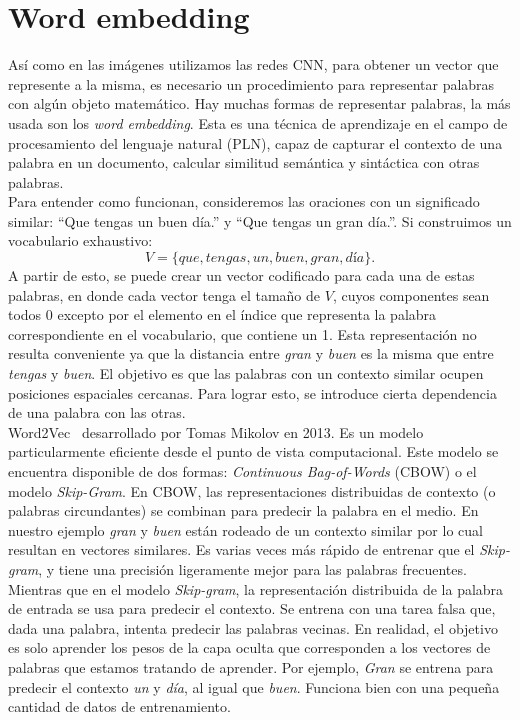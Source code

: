 \section{Word embedding} \label{sec:wordembedding}
Así como en las imágenes utilizamos las redes CNN, para obtener un vector que represente a la misma, es necesario un procedimiento para representar palabras con algún objeto matemático. Hay muchas formas de representar palabras, la más usada son los \textit{word embedding}. Esta es una técnica de aprendizaje en el campo de procesamiento del lenguaje natural (PLN), capaz de capturar el contexto de una palabra en un documento, calcular similitud semántica y sintáctica con otras palabras.\\

Para entender como funcionan, consideremos las oraciones con un significado similar: ``Que tengas un buen día.'' y ``Que tengas un gran día.''. Si construimos un vocabulario exhaustivo:
 \[ V = \{que, tengas, un, buen, gran, día\}. \]
A partir de esto, se puede crear un vector codificado para cada una de estas palabras, en donde cada vector tenga el tamaño de $V$, cuyos componentes sean todos 0 excepto por el elemento en el índice que representa la palabra correspondiente en el vocabulario, que contiene un 1. Esta representación no resulta conveniente ya que la distancia entre \textit{gran} y \textit{buen} es la misma que entre \textit{tengas} y \textit{buen}.  El objetivo es que las palabras con un contexto similar ocupen posiciones espaciales cercanas. Para lograr esto, se introduce cierta dependencia de una palabra con las otras.\\

Word2Vec~\cite{mikolov2013distributed} desarrollado por Tomas Mikolov en 2013. Es un modelo particularmente eficiente desde el punto de vista computacional. Este modelo se encuentra disponible de dos formas: \textit{Continuous Bag-of-Words} (CBOW) o el modelo \textit{Skip-Gram}. En CBOW, las representaciones distribuidas de contexto (o palabras circundantes) se combinan para predecir la palabra en el medio. En nuestro ejemplo \textit{gran} y \textit{buen} están rodeado de un contexto similar por lo cual resultan en vectores similares. Es varias veces más rápido de entrenar que el \textit{Skip-gram}, y tiene una precisión ligeramente mejor para las palabras frecuentes. Mientras que en el modelo \textit{Skip-gram}, la representación distribuida de la palabra de entrada se usa para predecir el contexto. Se entrena con una tarea falsa que, dada una palabra, intenta predecir las palabras vecinas. En realidad, el objetivo es solo aprender los pesos de la capa oculta que corresponden a los vectores de palabras que estamos tratando de aprender. Por ejemplo, \textit{Gran} se entrena para predecir el contexto \textit{un} y  \textit{día}, al igual que \textit{buen}. Funciona bien con una pequeña cantidad de datos de entrenamiento.

